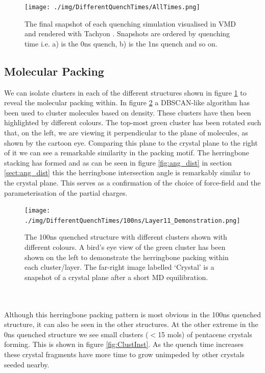 \begin{figure}[h]
	\texttt{[image: ./img/DifferentQuenchTimes/AllTimes.png]}
	\caption{\label{fig:final_snapshots}The final snapshot of each quenching simulation visualised in VMD \cite{VMD} and rendered with Tachyon \cite{Tachyon}. Snapshots are ordered by quenching time i.e. a) is the 0ns quench, b) is the 1ns quench and so on.}
\end{figure}
\subsection{Molecular Packing}
We can isolate clusters in each of the different structures shown in figure \ref{fig:final_snapshots} to reveal the molecular packing within. In figure \ref{fig:Layer11} a DBSCAN-like algorithm has been used to cluster molecules based on density. These clusters have then been highlighted by different colours. The top-most green cluster has been rotated such that, on the left, we are viewing it perpendicular to the plane of molecules, as shown by the cartoon eye. Comparing this plane to the crystal plane to the right of it we can see a remarkable similarity in the packing motif. The herringbone stacking has formed and as can be seen in figure \ref{fig:ang_dist} in section \ref{sect:ang_dist} this the herringbone intersection angle is remarkably similar to the crystal plane. This serves as a confirmation of the choice of force-field and the parameterisation of the partial charges.
\begin{figure}[h]
	\texttt{[image: ./img/DifferentQuenchTimes/100ns/Layer11\_Demonstration.png]}
	\caption{\label{fig:Layer11}The 100ns quenched structure with different clusters shown with different colours. A bird's eye view of the green cluster has been shown on the left to demonstrate the herringbone packing within each cluster/layer. The far-right image labelled `Crystal' is a snapshot of a crystal plane after a short MD equilibration.}
\end{figure}
\\\\
Although this herringbone packing pattern is most obvious in the 100ns quenched structure, it can also be seen in the other structures. At the other extreme in the 0ns quenched structure we see small clusters ($<$15 mols) of pentacene crystals forming. This is shown in figure \ref{fig:ClustInst}. As the quench time increases these crystal fragments have more time to grow unimpeded by other crystals seeded nearby.
